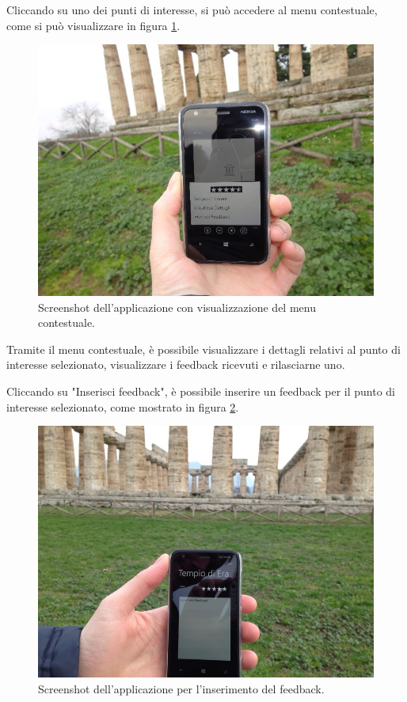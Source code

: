 Cliccando su uno dei punti di interesse, si può accedere al menu contestuale, come si può visualizzare in figura \ref{visualizzazionemenu}.
\begin{figure}[h!]
\begin{center}
\includegraphics[scale=0.4]{imgs/immaginiapp/visualizzazionemenu.jpg} 
\caption{Screenshot dell'applicazione con visualizzazione del menu contestuale.\label{visualizzazionemenu}}
\end{center}
\end{figure}
Tramite il menu contestuale, è possibile visualizzare i dettagli relativi al punto di interesse selezionato, visualizzare i feedback ricevuti e rilasciarne uno.

Cliccando su "Inserisci feedback", è possibile inserire un feedback per il punto di interesse selezionato, come mostrato in figura \ref{inserimentofeedback}.
\begin{figure}[h!]
\begin{center}
\includegraphics[scale=0.4]{imgs/immaginiapp/inserimentofeedback.jpg} 
\caption{Screenshot dell'applicazione per l'inserimento del feedback.\label{inserimentofeedback}}
\end{center}
\end{figure}


